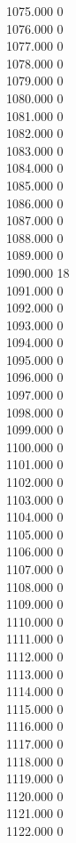 { 1075.000	0 \\
 1076.000	0 \\
 1077.000	0 \\
 1078.000	0 \\
 1079.000	0 \\
 1080.000	0 \\
 1081.000	0 \\
 1082.000	0 \\
 1083.000	0 \\
 1084.000	0 \\
 1085.000	0 \\
 1086.000	0 \\
 1087.000	0 \\
 1088.000	0 \\
 1089.000	0 \\
 1090.000	18 \\
 1091.000	0 \\
 1092.000	0 \\
 1093.000	0 \\
 1094.000	0 \\
 1095.000	0 \\
 1096.000	0 \\
 1097.000	0 \\
 1098.000	0 \\
 1099.000	0 \\
 1100.000	0 \\
 1101.000	0 \\
 1102.000	0 \\
 1103.000	0 \\
 1104.000	0 \\
 1105.000	0 \\
 1106.000	0 \\
 1107.000	0 \\
 1108.000	0 \\
 1109.000	0 \\
 1110.000	0 \\
 1111.000	0 \\
 1112.000	0 \\
 1113.000	0 \\
 1114.000	0 \\
 1115.000	0 \\
 1116.000	0 \\
 1117.000	0 \\
 1118.000	0 \\
 1119.000	0 \\
 1120.000	0 \\
 1121.000	0 \\
 1122.000	0 \\
}
